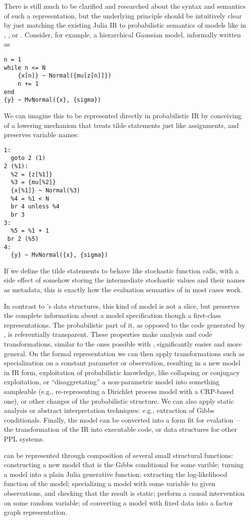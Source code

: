 There is still much to be clarified and researched about the syntax and semantics of such a
representation, but the underlying principle should be intuitively clear by just matching the
existing Julia IR to probabilistic semantics of models like in \turingjl{}, ,
or .  Consider, for example, a hierarchical Gaussian model, informally written
as
\begin{lstlisting}
n = 1
while n <= N
    {x[n]} ~ Normal({mu[z[n]]})
    n += 1
end
{y} ~ MvNormal({x}, {sigma})
\end{lstlisting}
We can imagine this to be represented directly in probabilistic IR by conceiving of a lowering
mechanism that treats tilde statements just like assignments, and preserves variable names:
\begin{lstlisting}
1:
  goto 2 (1)
2 (%1):
  %2 = {z[%1]}
  %3 = {mu[%2]}
  {x[%1]} ~ Normal(%3)
  %4 = %1 < N
  br 4 unless %4
  br 3
3:
  %5 = %1 + 1
 br 2 (%5)
4:
  {y} ~ MvNormal({x}, {sigma})
\end{lstlisting}
If we define the tilde statements to behave like stochastic function calls, with a side effect of
somehow storing the intermediate stochastic values and their names as metadata, this is exactly how
the evaluation semantics of \dppljl{} in most cases work.

In contrast to \autogibbsjl{}'s data structures, this kind of model is not a slice, but preserves
the complete information about a model specification though a first-class representations.  The
probabilistic part of it, as opposed to the code generated by \dppljl{}, is referentially
transparent.  These properties make analysis and code transformations, similar to the ones possible
with , significantly easier and more general.  On the formal representation
we can then apply transformations such as specialization on a constant parameter or observation,
resulting in a new model in IR form, exploitation of probabilistic knowledge, like collapsing or
conjugacy exploitation, or \enquote{disaggretating} a non-parametric model into something sampleable
(e.g., re-representing a Dirichlet process model with a CRP-based one), or other changes of the
probabilistic structure.  We can also apply static analysis or abstract interpretation techniques:
e.g., extraction of Gibbs conditionals.  Finally, the model can be converted into a form fit for
evalation~-- the transformation of the IR into executable code, or data structures for other PPL
systems.

 can be represented through composition of several small structural
functions: constructing a new model that is the Gibbs conditional for some varible; turning a model
into a plain Julia generative function; extracting the log-likelihood function of the model;
specializing a model with some variable to given observations, and checking that the result is
static; perform a causal intervention on some random variable; of converting a model with fixed data
into a factor graph representation.

